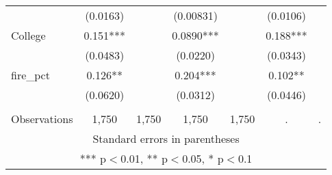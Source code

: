 \begin{tabular}{lcccccc}
 & (0.0163) &  & (0.00831) &  & (0.0106) &  \\
College & 0.151*** &  & 0.0890*** &  & 0.188*** &  \\
 & (0.0483) &  & (0.0220) &  & (0.0343) &  \\
fire\_pct & 0.126** &  & 0.204*** &  & 0.102** &  \\
 & (0.0620) &  & (0.0312) &  & (0.0446) &  \\
 &  &  &  &  &  &  \\
 Observations & 1,750 & 1,750 & 1,750 & 1,750 & . & . \\ \hline
\multicolumn{7}{c}{ Standard errors in parentheses} \\
\multicolumn{7}{c}{ *** p$<$0.01, ** p$<$0.05, * p$<$0.1} \\
\end{tabular}
